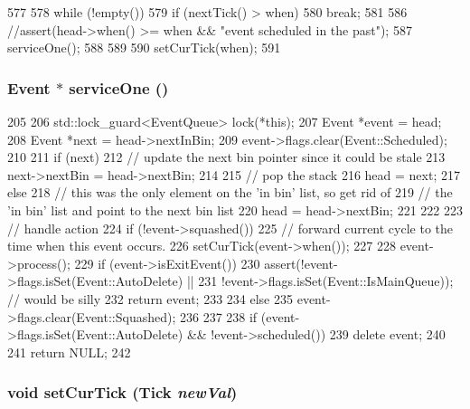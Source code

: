 \begin{DoxyCode}
577     {
578         while (!empty()) {
579             if (nextTick() > when)
580                 break;
581 
586             //assert(head->when() >= when && "event scheduled in the past");
587             serviceOne();
588         }
589 
590         setCurTick(when);
591     }
\end{DoxyCode}
\hypertarget{classEventQueue_a95b9c78d6fb18e716e5d13362b609798}{
\subsubsection[{serviceOne}]{\setlength{\rightskip}{0pt plus 5cm}Event $\ast$ serviceOne ()}}
\label{classEventQueue_a95b9c78d6fb18e716e5d13362b609798}



\begin{DoxyCode}
205 {
206     std::lock_guard<EventQueue> lock(*this);
207     Event *event = head;
208     Event *next = head->nextInBin;
209     event->flags.clear(Event::Scheduled);
210 
211     if (next) {
212         // update the next bin pointer since it could be stale
213         next->nextBin = head->nextBin;
214 
215         // pop the stack
216         head = next;
217     } else {
218         // this was the only element on the 'in bin' list, so get rid of
219         // the 'in bin' list and point to the next bin list
220         head = head->nextBin;
221     }
222 
223     // handle action
224     if (!event->squashed()) {
225         // forward current cycle to the time when this event occurs.
226         setCurTick(event->when());
227 
228         event->process();
229         if (event->isExitEvent()) {
230             assert(!event->flags.isSet(Event::AutoDelete) ||
231                    !event->flags.isSet(Event::IsMainQueue)); // would be silly
232             return event;
233         }
234     } else {
235         event->flags.clear(Event::Squashed);
236     }
237 
238     if (event->flags.isSet(Event::AutoDelete) && !event->scheduled())
239         delete event;
240 
241     return NULL;
242 }
\end{DoxyCode}
\hypertarget{classEventQueue_abc2f41fbb4828612a2637268ab8ce640}{
\subsubsection[{setCurTick}]{\setlength{\rightskip}{0pt plus 5cm}void setCurTick ({\bf Tick} {\em newVal})}}
\label{classEventQueue_abc2f41fbb4828612a2637268ab8ce640}



